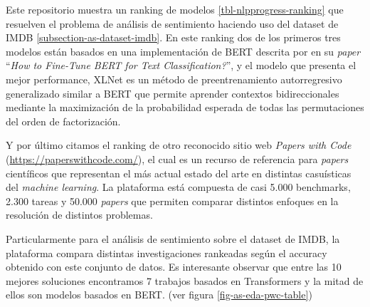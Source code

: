 Este repositorio muestra un ranking de modelos \ref{tbl-nlpprogress-ranking} que resuelven el problema de análisis de sentimiento haciendo uso del dataset de IMDB \ref{subsection-as-dataset-imdb}. En este ranking dos de los primeros tres modelos están basados en una implementación de BERT descrita por  \cite{FTBERTCLAS_https://doi.org/10.48550/arxiv.1905.05583} en su \textit{paper} ``\textit{How to Fine-Tune BERT for Text Classification?}'', y el modelo que presenta el mejor performance, XLNet \cite{XLNET_https://doi.org/10.48550/arxiv.1906.08237} es un método de preentrenamiento autorregresivo generalizado similar a BERT que permite aprender contextos bidireccionales mediante la maximización de la probabilidad esperada de todas las permutaciones del orden de factorización.



Y por último citamos el ranking de otro reconocido sitio web \textit{Papers with Code} (\url{https://paperswithcode.com/}), el cual es un recurso de referencia para \textit{papers} científicos que representan el más actual estado del arte en distintas casuísticas del \textit{machine learning}. La plataforma está compuesta de casi 5.000 benchmarks, 2.300 tareas y 50.000 \textit{papers} que permiten comparar distintos enfoques en la resolución de distintos problemas.

Particularmente para el análisis de sentimiento sobre el dataset de IMDB, la plataforma compara distintas investigaciones rankeadas según el accuracy obtenido con este conjunto de datos. Es interesante observar que entre las 10 mejores soluciones encontramos 7 trabajos basados en Transformers y la mitad de ellos son modelos basados en BERT. (ver figura \ref{fig-as-eda-pwc-table})


